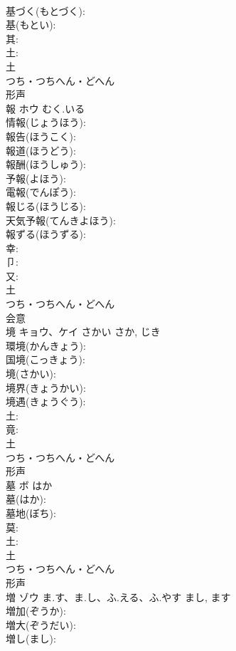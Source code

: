 \documentclass[8pt]{extreport}
\begin{document}
\begin{CJK}{UTF8}{min}
\\	基づく(もとづく): 
\\	基(もとい): 
\\	其: 
\\	土: 
\\	土	
\\	つち・つちへん・どへん	
\\	形声 
\\	報	ホウ	むく.いる		
\\	情報(じょうほう): 
\\	報告(ほうこく): 
\\	報道(ほうどう): 
\\	報酬(ほうしゅう): 
\\	予報(よほう): 
\\	電報(でんぽう): 
\\	報じる(ほうじる): 
\\	天気予報(てんきよほう): 
\\	報ずる(ほうずる): 
\\	幸: 
\\	卩: 
\\	又: 
\\	土	
\\	つち・つちへん・どへん	
\\	会意 
\\	境	キョウ、ケイ	さかい	さか, じき	
\\	環境(かんきょう): 
\\	国境(こっきょう): 
\\	境(さかい): 
\\	境界(きょうかい): 
\\	境遇(きょうぐう): 
\\	土: 
\\	竟: 
\\	土	
\\	つち・つちへん・どへん	
\\	形声 
\\	墓	ボ	はか		
\\	墓(はか): 
\\	墓地(ぼち): 
\\	莫: 
\\	土: 
\\	土	
\\	つち・つちへん・どへん	
\\	形声 
\\	増	ゾウ	ま.す、ま.し、ふ.える、ふ.やす	まし, ます	
\\	増加(ぞうか): 
\\	増大(ぞうだい): 
\\	増し(まし): 

\end{CJK}
\end{document}
